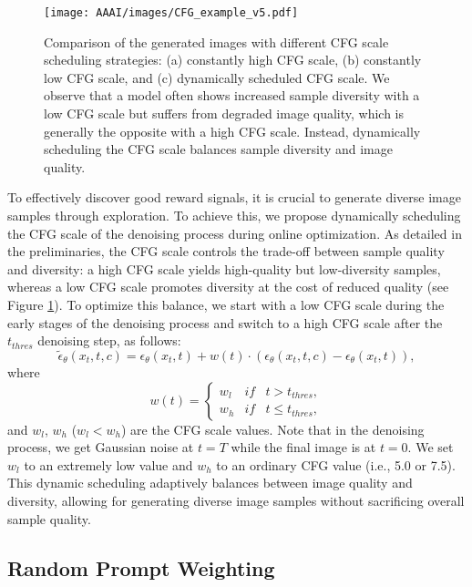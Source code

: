 \begin{figure}[t]
  \centering
  \texttt{[image: AAAI/images/CFG\_example\_v5.pdf]}
  \caption{Comparison of the generated images with different CFG scale scheduling strategies: (a) constantly high CFG scale, (b) constantly low CFG scale, and (c) dynamically scheduled CFG scale. We observe that a model often shows increased sample diversity with a low CFG scale but suffers from degraded image quality, which is generally the opposite with a high CFG scale. Instead, dynamically scheduling the CFG scale balances sample diversity and image quality. 
  }
  \label{fig:cfg_scale_comparison}
\end{figure}

To effectively discover good reward signals, it is crucial to generate diverse image samples through exploration. To achieve this, we propose dynamically scheduling the CFG scale of the denoising process during online optimization. 
As detailed in the preliminaries, the CFG scale controls the trade-off between sample quality and diversity: a high CFG scale yields high-quality but low-diversity samples, whereas a low CFG scale promotes diversity at the cost of reduced quality (see Figure \ref{fig:cfg_scale_comparison}).
To optimize this balance, we start with a low CFG scale during the early stages of the denoising process and switch to a high CFG scale after the $t_{thres}$ denoising step, as follows:
$$\tilde{\epsilon}_\theta\left(x_t, t, c\right) = \epsilon_\theta\left(x_t, t\right) + w(t)\cdot\left(\epsilon_\theta\left(x_t, t, c\right) - \epsilon_\theta\left(x_t, t\right)\right),$$
where
\begin{equation}
    w(t) = \left\{ 
    \begin{array}{lll}
        w_l & \textit{if} &  t > t_{thres}, \\
        w_h & \textit{if} & t \leq t_{thres},
    \end{array}
    \right.
\end{equation}
and $w_l$, $w_h$ ($w_l < w_h$) are the CFG scale values. Note that in the denoising process, we get Gaussian noise at $t=T$ while the final image is at $t=0$. We set $w_l$ to an extremely low value and $w_h$ to an ordinary CFG value (i.e., 5.0 or 7.5).
This dynamic scheduling adaptively balances between image quality and diversity, allowing for generating diverse image samples without sacrificing overall sample quality.


\subsection{Random Prompt Weighting}

